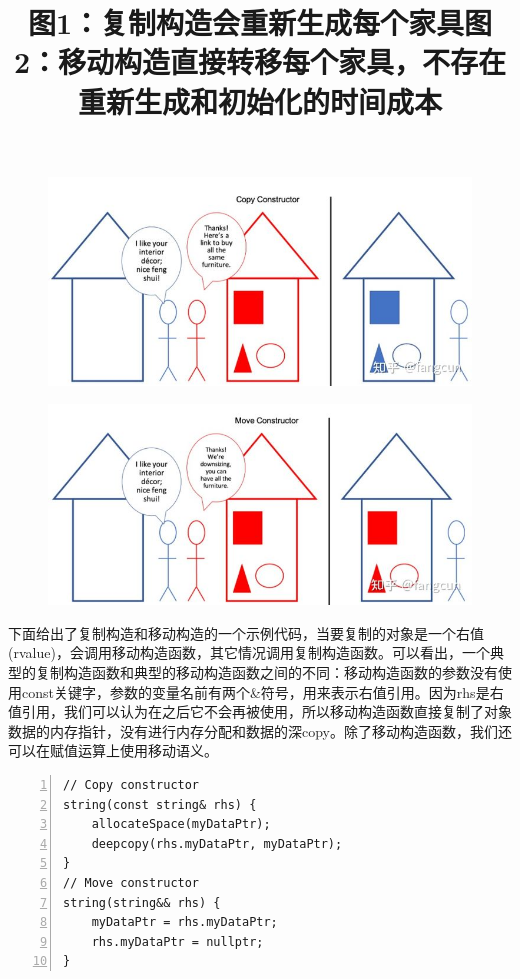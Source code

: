\documentclass{ctexart}
\begin{document}
\begin{figure}[H]
	\title{图1：复制构造会重新生成每个家具}
	\centering
	\includegraphics[scale=0.5]{img/1-1.jpg}
\end{figure}

\begin{figure}[H]
	\title{图2：移动构造直接转移每个家具，不存在重新生成和初始化的时间成本}
	\centering
	\includegraphics[scale=0.5]{img/1-2.jpg}
\end{figure}

下面给出了复制构造和移动构造的一个示例代码，当要复制的对象是一个右值(rvalue)，会调用移动构造函数，其它情况调用复制构造函数。可以看出，一个典型的复制构造函数和典型的移动构造函数之间的不同：移动构造函数的参数没有使用const关键字，参数的变量名前有两个\&符号，用来表示右值引用。因为rhs是右值引用，我们可以认为在之后它不会再被使用，所以移动构造函数直接复制了对象数据的内存指针，没有进行内存分配和数据的深copy。除了移动构造函数，我们还可以在赋值运算上使用移动语义。

\begin{lstlisting}[language={[ANSI]C},keywordstyle=\color{blue!70},commentstyle=\color{red!50!green!50!blue!50},frame=shadowbox, rulesepcolor=\color{red!20!green!20!blue!20},basicstyle=\small,numbers=left, numberstyle=\tiny,breaklines=true]
// Copy constructor  
string(const string& rhs) {  
	allocateSpace(myDataPtr);  
	deepcopy(rhs.myDataPtr, myDataPtr);  
}  
// Move constructor  
string(string&& rhs) {  
	myDataPtr = rhs.myDataPtr;  
	rhs.myDataPtr = nullptr;  
}
\end{lstlisting}
\end{document}
